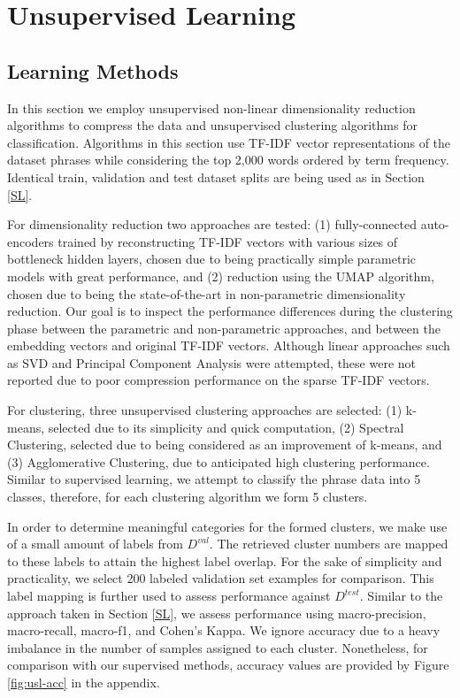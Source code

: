 \documentclass{article}
\begin{document}
\section{Unsupervised Learning}

\subsection{Learning Methods}

In this section we employ unsupervised non-linear dimensionality reduction algorithms to compress the data and unsupervised clustering algorithms for classification. Algorithms in this section use TF-IDF vector representations of the dataset phrases while considering the top 2,000 words ordered by term frequency. Identical train, validation and test dataset splits are being used as in Section \ref{SL}. 

For dimensionality reduction two approaches are tested: (1) fully-connected auto-encoders trained by reconstructing TF-IDF vectors with various sizes of bottleneck hidden layers, chosen due to being practically simple parametric models with great performance, and (2) reduction using the UMAP \cite{mcinnes2018umap} algorithm, chosen due to being the state-of-the-art in non-parametric dimensionality reduction. Our goal is to inspect the performance differences during the clustering phase between the parametric and non-parametric approaches, and between the embedding vectors and original TF-IDF vectors. Although linear approaches such as SVD and Principal Component Analysis were attempted, these were not reported due to poor compression performance on the sparse TF-IDF vectors.

For clustering, three unsupervised clustering approaches are selected: (1) k-means, selected due to its simplicity and quick computation, (2) Spectral Clustering, selected due to being considered as an improvement of k-means, and (3) Agglomerative Clustering, due to anticipated high clustering performance. Similar to supervised learning, we attempt to classify the phrase data into 5 classes, therefore, for each clustering algorithm we form 5 clusters. 

In order to determine meaningful categories for the formed clusters, we make use of a small amount of labels from $D^{val}$. The retrieved cluster numbers are mapped to these labels to attain the highest label overlap. For the sake of simplicity and practicality, we select 200 labeled validation set examples for comparison. This label mapping is further used to assess performance against $D^{test}$. Similar to the approach taken in Section \ref{SL}, we assess performance using macro-precision, macro-recall, macro-f1, and Cohen's Kappa. We ignore accuracy due to a heavy imbalance in the number of samples assigned to each cluster. Nonetheless, for comparison with our supervised methods, accuracy values are provided by Figure \ref{fig:usl-acc} in the appendix. 
\end{document}
